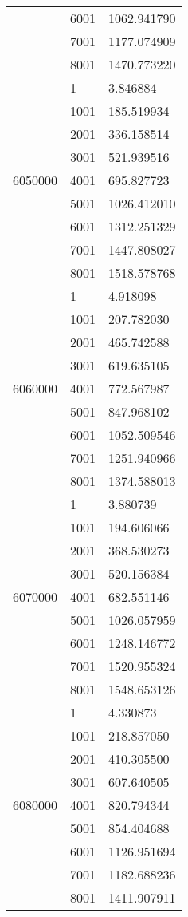 \begin{table}[htb!]
\begin{tabular}{lll}
 & 6001 & 1062.941790 \\
 & 7001 & 1177.074909 \\
 & 8001 & 1470.773220 \\
\multirow[c]{9}{*}{6050000} & 1 & 3.846884 \\
 & 1001 & 185.519934 \\
 & 2001 & 336.158514 \\
 & 3001 & 521.939516 \\
 & 4001 & 695.827723 \\
 & 5001 & 1026.412010 \\
 & 6001 & 1312.251329 \\
 & 7001 & 1447.808027 \\
 & 8001 & 1518.578768 \\
\multirow[c]{9}{*}{6060000} & 1 & 4.918098 \\
 & 1001 & 207.782030 \\
 & 2001 & 465.742588 \\
 & 3001 & 619.635105 \\
 & 4001 & 772.567987 \\
 & 5001 & 847.968102 \\
 & 6001 & 1052.509546 \\
 & 7001 & 1251.940966 \\
 & 8001 & 1374.588013 \\
\multirow[c]{9}{*}{6070000} & 1 & 3.880739 \\
 & 1001 & 194.606066 \\
 & 2001 & 368.530273 \\
 & 3001 & 520.156384 \\
 & 4001 & 682.551146 \\
 & 5001 & 1026.057959 \\
 & 6001 & 1248.146772 \\
 & 7001 & 1520.955324 \\
 & 8001 & 1548.653126 \\
\multirow[c]{9}{*}{6080000} & 1 & 4.330873 \\
 & 1001 & 218.857050 \\
 & 2001 & 410.305500 \\
 & 3001 & 607.640505 \\
 & 4001 & 820.794344 \\
 & 5001 & 854.404688 \\
 & 6001 & 1126.951694 \\
 & 7001 & 1182.688236 \\
 & 8001 & 1411.907911 \\

\end{tabular}
\end{table}
